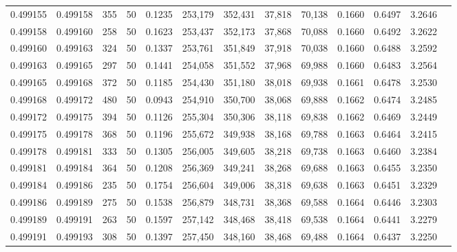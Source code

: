 \begin{tabular}{rrrrrrrrrrrrr}
0.499155 & 0.499158 & 355 &  50 &                                     0.1235 & 253,179 & 352,431 &  37,818 &  70,138 & 0.1660 & 0.6497 & 3.2646 \\
0.499158 & 0.499160 & 258 &  50 &                                     0.1623 & 253,437 & 352,173 &  37,868 &  70,088 & 0.1660 & 0.6492 & 3.2622 \\
0.499160 & 0.499163 & 324 &  50 &                                     0.1337 & 253,761 & 351,849 &  37,918 &  70,038 & 0.1660 & 0.6488 & 3.2592 \\
0.499163 & 0.499165 & 297 &  50 &                                     0.1441 & 254,058 & 351,552 &  37,968 &  69,988 & 0.1660 & 0.6483 & 3.2564 \\
0.499165 & 0.499168 & 372 &  50 &                                     0.1185 & 254,430 & 351,180 &  38,018 &  69,938 & 0.1661 & 0.6478 & 3.2530 \\
0.499168 & 0.499172 & 480 &  50 &                                     0.0943 & 254,910 & 350,700 &  38,068 &  69,888 & 0.1662 & 0.6474 & 3.2485 \\
0.499172 & 0.499175 & 394 &  50 &                                     0.1126 & 255,304 & 350,306 &  38,118 &  69,838 & 0.1662 & 0.6469 & 3.2449 \\
0.499175 & 0.499178 & 368 &  50 &                                     0.1196 & 255,672 & 349,938 &  38,168 &  69,788 & 0.1663 & 0.6464 & 3.2415 \\
0.499178 & 0.499181 & 333 &  50 &                                     0.1305 & 256,005 & 349,605 &  38,218 &  69,738 & 0.1663 & 0.6460 & 3.2384 \\
0.499181 & 0.499184 & 364 &  50 &                                     0.1208 & 256,369 & 349,241 &  38,268 &  69,688 & 0.1663 & 0.6455 & 3.2350 \\
0.499184 & 0.499186 & 235 &  50 &                                     0.1754 & 256,604 & 349,006 &  38,318 &  69,638 & 0.1663 & 0.6451 & 3.2329 \\
0.499186 & 0.499189 & 275 &  50 &                                     0.1538 & 256,879 & 348,731 &  38,368 &  69,588 & 0.1664 & 0.6446 & 3.2303 \\
0.499189 & 0.499191 & 263 &  50 &                                     0.1597 & 257,142 & 348,468 &  38,418 &  69,538 & 0.1664 & 0.6441 & 3.2279 \\
0.499191 & 0.499193 & 308 &  50 &                                     0.1397 & 257,450 & 348,160 &  38,468 &  69,488 & 0.1664 & 0.6437 & 3.2250 \\

\end{tabular}
